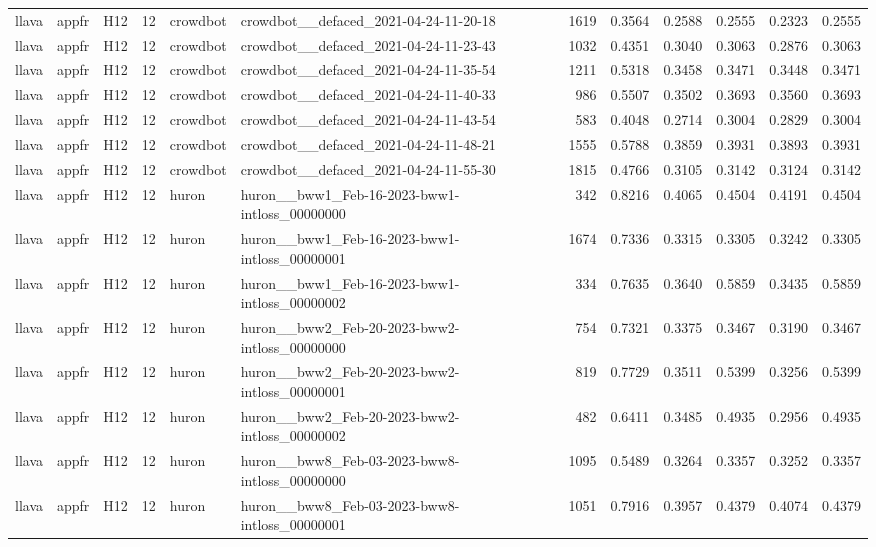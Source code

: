 \begin{table}[tbp]
\begin{tabular}{lllrllrrrrrr}
llava & appfr & H12 & 12 & crowdbot & crowdbot\_\_defaced\_2021-04-24-11-20-18 & 1619 & 0.3564 & 0.2588 & 0.2555 & 0.2323 & 0.2555 \\
llava & appfr & H12 & 12 & crowdbot & crowdbot\_\_defaced\_2021-04-24-11-23-43 & 1032 & 0.4351 & 0.3040 & 0.3063 & 0.2876 & 0.3063 \\
llava & appfr & H12 & 12 & crowdbot & crowdbot\_\_defaced\_2021-04-24-11-35-54 & 1211 & 0.5318 & 0.3458 & 0.3471 & 0.3448 & 0.3471 \\
llava & appfr & H12 & 12 & crowdbot & crowdbot\_\_defaced\_2021-04-24-11-40-33 & 986 & 0.5507 & 0.3502 & 0.3693 & 0.3560 & 0.3693 \\
llava & appfr & H12 & 12 & crowdbot & crowdbot\_\_defaced\_2021-04-24-11-43-54 & 583 & 0.4048 & 0.2714 & 0.3004 & 0.2829 & 0.3004 \\
llava & appfr & H12 & 12 & crowdbot & crowdbot\_\_defaced\_2021-04-24-11-48-21 & 1555 & 0.5788 & 0.3859 & 0.3931 & 0.3893 & 0.3931 \\
llava & appfr & H12 & 12 & crowdbot & crowdbot\_\_defaced\_2021-04-24-11-55-30 & 1815 & 0.4766 & 0.3105 & 0.3142 & 0.3124 & 0.3142 \\
llava & appfr & H12 & 12 & huron & huron\_\_bww1\_Feb-16-2023-bww1-intloss\_00000000 & 342 & 0.8216 & 0.4065 & 0.4504 & 0.4191 & 0.4504 \\
llava & appfr & H12 & 12 & huron & huron\_\_bww1\_Feb-16-2023-bww1-intloss\_00000001 & 1674 & 0.7336 & 0.3315 & 0.3305 & 0.3242 & 0.3305 \\
llava & appfr & H12 & 12 & huron & huron\_\_bww1\_Feb-16-2023-bww1-intloss\_00000002 & 334 & 0.7635 & 0.3640 & 0.5859 & 0.3435 & 0.5859 \\
llava & appfr & H12 & 12 & huron & huron\_\_bww2\_Feb-20-2023-bww2-intloss\_00000000 & 754 & 0.7321 & 0.3375 & 0.3467 & 0.3190 & 0.3467 \\
llava & appfr & H12 & 12 & huron & huron\_\_bww2\_Feb-20-2023-bww2-intloss\_00000001 & 819 & 0.7729 & 0.3511 & 0.5399 & 0.3256 & 0.5399 \\
llava & appfr & H12 & 12 & huron & huron\_\_bww2\_Feb-20-2023-bww2-intloss\_00000002 & 482 & 0.6411 & 0.3485 & 0.4935 & 0.2956 & 0.4935 \\
llava & appfr & H12 & 12 & huron & huron\_\_bww8\_Feb-03-2023-bww8-intloss\_00000000 & 1095 & 0.5489 & 0.3264 & 0.3357 & 0.3252 & 0.3357 \\
llava & appfr & H12 & 12 & huron & huron\_\_bww8\_Feb-03-2023-bww8-intloss\_00000001 & 1051 & 0.7916 & 0.3957 & 0.4379 & 0.4074 & 0.4379 \\

\end{tabular}
\end{table}
